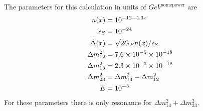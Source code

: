 \documentclass[letterpaper,12pt,english]{sphinxmanual}
\begin{document}
The parameters for this calculation in units of \(GeV^{\mathrm{some power}}\) are
\begin{gather}
\begin{split}n(x) &= 10^{-12 - 4.3 x} \\
\epsilon_S &= 10^{-24}\\
\tilde\Delta(x) &= \sqrt{2} G_F n(x)/\epsilon_S\\
\Delta m _ {12}^2 &= 7.6\times 10^{-5}\times 10^{-18}\\
\Delta m _ {13}^2 &= 2.3\times 10^{-3}\times 10^{-18}\\
\Delta m _ {23}^2 &= \Delta m _ {13}^2 - \Delta m _ {12}^2\\
E &= 10^{-3}\end{split}\notag
\end{gather}
For these parameters there is only resonance for \(\Delta m_{13}^2+\Delta m_{23}^2\).
\end{document}
